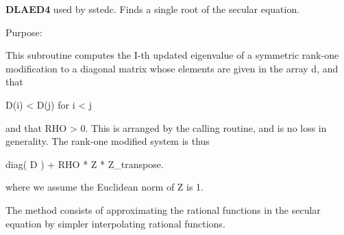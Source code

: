 {\bfseries D\+L\+A\+E\+D4} used by sstedc. Finds a single root of the secular equation. 

 \begin{DoxyParagraph}{Purpose\+: }
\begin{DoxyVerb} This subroutine computes the I-th updated eigenvalue of a symmetric
 rank-one modification to a diagonal matrix whose elements are
 given in the array d, and that

            D(i) < D(j)  for  i < j

 and that RHO > 0.  This is arranged by the calling routine, and is
 no loss in generality.  The rank-one modified system is thus

            diag( D )  +  RHO * Z * Z_transpose.

 where we assume the Euclidean norm of Z is 1.

 The method consists of approximating the rational functions in the
 secular equation by simpler interpolating rational functions.\end{DoxyVerb}
 
\end{DoxyParagraph}

